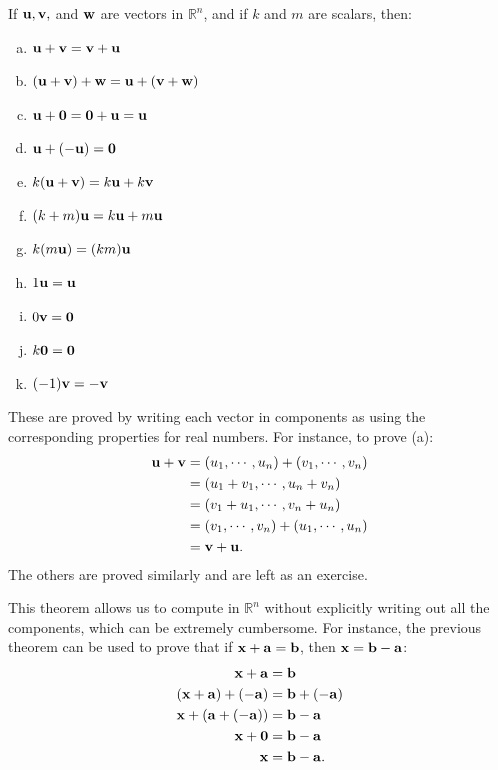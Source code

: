 \documentclass[12pt,letterpaper,reqno]{article}
\numberwithin{equation}{section}
\begin{document}
\begin{thm}
If ${\bf u}, {\bf v},$ and ${\bf w}$ are vectors in $\mathbb{R}^n$, and if $k$ and $m$ are scalars, then:
	\begin{enumerate}[(a)]
		\item ${\bf u}+{\bf v}={\bf v}+{\bf u}$
		\item $({\bf u}+{\bf v})+{\bf w}={\bf u}+({\bf v}+{\bf w})$
		\item ${\bf u}+{\bf 0}={\bf 0}+{\bf u}={\bf u}$
		\item ${\bf u}+(-{\bf u})={\bf 0}$
		\item $k({\bf u}+{\bf v})=k{\bf u}+k{\bf v}$
		\item $(k+m){\bf u}=k{\bf u}+m{\bf u}$
		\item $k(m{\bf u})=(km){\bf u}$
		\item $1{\bf u}={\bf u}$
		\item $0{\bf v}={\bf 0}$
		\item $k{\bf 0}={\bf 0}$
		\item $(-1){\bf v}=-{\bf v}$
	\end{enumerate}
\end{thm}

\begin{pf}
These are proved by writing each vector in components as using the corresponding properties for real numbers. For instance, to prove (a):
\begin{align*}
	{\bf u}+{\bf v}&=(u_1,\cdots,u_n)+(v_1,\cdots,v_n) \\
	&=(u_1+v_1, \cdots, u_n+v_n) \\
	&=(v_1+u_1, \cdots, v_n+u_n) \\ 
	&=(v_1,\cdots,v_n)+(u_1,\cdots,u_n) \\
	&={\bf v}+{\bf u}.
\end{align*}	
The others are proved similarly and are left as an exercise.
\end{pf}

This theorem allows us to compute in $\mathbb{R}^n$ without explicitly writing out all the components, which can be extremely cumbersome. For instance, the previous theorem can be used to prove that if ${\bf x}+{\bf a}={\bf b}$, then ${\bf x}={\bf b}-{\bf a}$:
\begin{align*}
	{\bf x}+{\bf a}&={\bf b} \\
	({\bf x}+{\bf a})+(-{\bf a})&={\bf b}+(-{\bf a}) \\
	{\bf x}+({\bf a}+(-{\bf a}))&={\bf b}-{\bf a} \\
	{\bf x}+{\bf 0}&={\bf b}-{\bf a} \\
	{\bf x}&={\bf b}-{\bf a}.
\end{align*}
\end{document}
